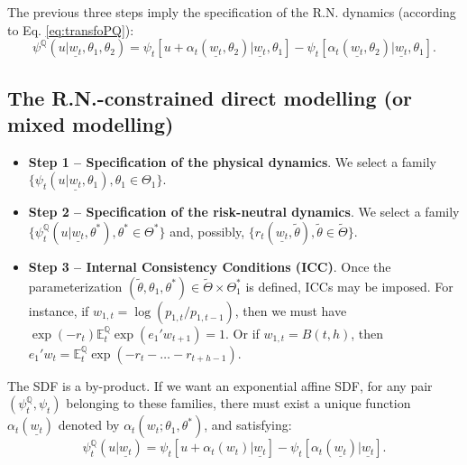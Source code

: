 \documentclass[
  12pt,
]{book}
\providecommand{\tightlist}{%
  \setlength{\itemsep}{0pt}\setlength{\parskip}{0pt}}
\theoremstyle{definition}
\theoremstyle{definition}
\theoremstyle{definition}
\theoremstyle{definition}
\theoremstyle{remark}
\begin{document}
The previous three steps imply the specification of the R.N. dynamics (according to Eq. \eqref{eq:transfoPQ}):
\begin{equation*}
\psi^{\mathbb{Q}} (u | \underline{w_t}, \theta_1, \theta_2) =
\psi_t \left[ u + \alpha_t (\underline{w_t}, \theta_2) |
\underline{w_t}, \theta_1 \right] - \psi_t \left[ \alpha_t
(\underline{w_t}, \theta_2) | \underline{w_t}, \theta_1
\right].
\end{equation*}

\hypertarget{the-r.n.-constrained-direct-modelling-or-mixed-modelling}{%
\subsection{The R.N.-constrained direct modelling (or mixed modelling)}\label{the-r.n.-constrained-direct-modelling-or-mixed-modelling}}

\begin{itemize}
\tightlist
\item
  \textbf{Step 1 -- Specification of the physical dynamics}. We select a family \(\{ \psi_t (u | \underline{w_t},\theta_1), \theta_1 \in \Theta_1 \}\).
\item
  \textbf{Step 2 -- Specification of the risk-neutral dynamics}. We select a family \(\{\psi^{\mathbb{Q}}_t (u | \underline{w_t}, \theta^*),\theta^* \in \Theta^* \}\) and, possibly, \(\{r_{t}(\underline{w_t},\tilde{\theta}),\tilde{\theta}\in\tilde{\Theta}\}\).
\item
  \textbf{Step 3 -- Internal Consistency Conditions (ICC)}. Once the parameterization \((\tilde{\theta}, \theta_1, \theta^*) \in \tilde{\Theta} \times \Theta^*_1\) is defined, ICCs may be imposed. For instance, if \(w_{1,t} = \log(p_{1,t}/p_{1,t-1})\), then we must have \(\exp(-r_t)\mathbb{E}^{\mathbb{Q}}_t \exp (e_{1}' w_{t+1}) = 1\). Or if \(w_{1,t} = B(t,h)\), then \(e_{1}' w_{t} = \mathbb{E}_t^{\mathbb{Q}} \exp(-r_t - \dots - r_{t+h-1})\).
\end{itemize}

The SDF is a by-product. If we want an exponential affine SDF, for any pair \((\psi^{\mathbb{Q}}_t, \psi_t)\) belonging to these families, there must exist a unique function \(\alpha_t (\underline{w_t})\) denoted by \(\alpha_t (w_t ; \theta_1, \theta^*)\), and satisfying:
\begin{equation*}
\psi^{\mathbb{Q}}_t (u | \underline{w_t}) = \psi_t \left[ u +
\alpha_t (w_t) | \underline{w_t} \right] - \psi_t \left[
\alpha_t (\underline{w_t}) | \underline{w_t} \right].
\end{equation*}
\end{document}
